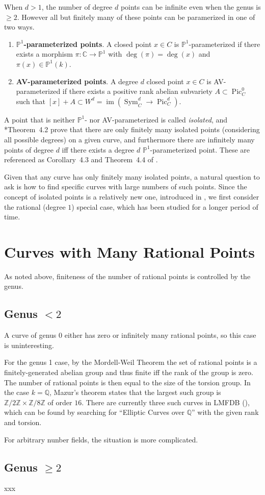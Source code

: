 \documentclass[12pt, reqno]{amsart}
\newcommand{\PP}{{\mathbb P}}
\newcommand{\C}{{\mathbb C}}
\newcommand{\Q}{{\mathbb Q}}
\newcommand{\Z}{{\mathbb Z}}
\DeclareMathOperator{\im}{im}
\DeclareMathOperator{\Sym}{Sym}
\DeclareMathOperator{\Pic}{Pic}
\numberwithin{equation}{section}
\numberwithin{table}{section}
\begin{document}
When $d > 1$, the number of degree $d$ points can be infinite even
when the genus is $\ge 2$. However all but finitely many of these
points can be paramerized in one of two ways.
\begin{enumerate}
  \item \textbf{$\PP^1$-parameterized points}. A closed point $x \in
    C$ is $\PP^1$-parameterized if there exists a morphism $\pi : \C \to \PP^1$ with
    $\deg(\pi) = \deg(x)$ and $\pi(x) \in \PP^1(k)$.

  \item \textbf{AV-parameterized points}. A degree $d$ closed point $x
    \in C$ is AV-parameterized if there exists a positive rank abelian
    subvariety $A \subset \Pic^0_C$ such that $[x] + A \subset W^d =
    \im(\Sym^d_C \to \Pic^d_C)$.
\end{enumerate}

A point that is neither $\PP^1$- nor AV-parameterized is called
\textit{isolated}, and \cite{Bourdon2019}*{Theorem~4.2} prove that
there are only finitely many isolated points (considering all possible
degrees) on a given curve, and furthermore there are infinitely many
points of degree $d$ iff there exists a degree $d$
$\PP^1$-parameterized point.  These are referenced as Corollary~4.3
and Theorem~4.4 of \cite{Viray2024}.

Given that any curve has only finitely many isolated points, a natural
question to ask is how to find specific curves with large numbers of
such points. Since the concept of isolated points is a relatively new
one, introduced in \cite{Bourdon2019}, we first consider the rational
(degree $1$) special case, which has been studied for a longer period
of time.


\section{Curves with Many Rational Points}

As noted above, finiteness of the number of rational points is controlled by the genus.

\subsection{Genus \texorpdfstring{$< 2$}{< 2}}

A curve of genus 0 either has zero or infinitely many rational points,
so this case is uninteresting.

For the genus 1 case, by the Mordell-Weil Theorem the set of rational
points is a finitely-generated abelian group and thus finite iff the
rank of the group is zero. The number of rational points is then equal
to the size of the torsion group. In the case $k=\Q$, Mazur's theorem
states that the largest such group is $\Z/2\Z \times \Z/8\Z$ of order
$16$. There are currently three such curves in LMFDB (\cite{lmfdb}),
which can be found by searching for ``Elliptic Curves over $\Q$'' with
the given rank and torsion.

For arbitrary nunber fields, the situation is more complicated. 

\subsection{Genus \texorpdfstring{$\ge 2$}{≥ 2}}

xxx


\end{document}
